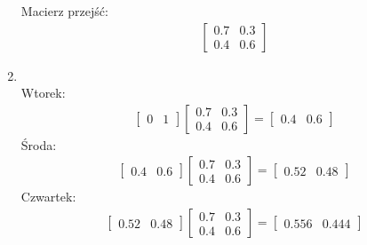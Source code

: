 \documentclass[12pt]{article}
\begin{document}
\begin{enumerate}
\begin{center}
            Macierz przejść:
            \begin{align*}
                \begin{bmatrix}
                    0.7 & 0.3\\
                    0.4 & 0.6
                \end{bmatrix}
            \end{align*}
        \end{center}
        \item \hfill \\
        Wtorek:
        \begin{align*}
            \begin{bmatrix}
                0 & 1
            \end{bmatrix}
            \begin{bmatrix}
                0.7 & 0.3\\
                0.4 & 0.6
            \end{bmatrix}
            =
            \begin{bmatrix}
                0.4 & 0.6
            \end{bmatrix}
        \end{align*}
        Środa:
        \begin{align*}
            \begin{bmatrix}
                0.4 & 0.6
            \end{bmatrix}
            \begin{bmatrix}
                0.7 & 0.3\\
                0.4 & 0.6
            \end{bmatrix}
            =
            \begin{bmatrix}
                0.52 & 0.48
            \end{bmatrix}
        \end{align*}
        Czwartek:
        \begin{align*}
            \begin{bmatrix}
                0.52 & 0.48
            \end{bmatrix}
            \begin{bmatrix}
                0.7 & 0.3\\
                0.4 & 0.6
            \end{bmatrix}
            =
            \begin{bmatrix}
                0.556 & 0.444
            \end{bmatrix}

\end{align*}
\end{enumerate}
\end{document}
